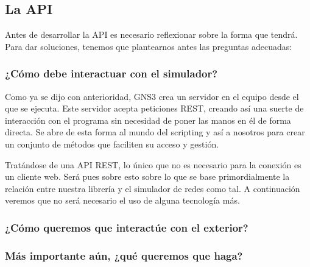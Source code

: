 \subsection{La API}
Antes de desarrollar la API es necesario reflexionar sobre la forma que tendrá. Para dar soluciones, tenemos que plantearnos antes las preguntas adecuadas:
\subsubsection[''Interacción con GNS3'']{¿Cómo debe interactuar con el simulador?}
Como ya se dijo con anterioridad, GNS3 crea un servidor en el equipo desde el que se ejecuta. Este servidor acepta peticiones REST, creando así una suerte de interacción con el programa sin necesidad de poner las manos en él de forma directa. Se abre de esta forma al mundo del scripting y así a nosotros para crear un conjunto de métodos que faciliten su acceso y gestión.

Tratándose de una API REST, lo único que no es necesario para la conexión es un cliente web. Será pues sobre esto sobre lo que se base primordialmente la relación entre nuestra librería y el simulador de redes como tal. A continuación veremos que no será necesario el uso de alguna tecnología más.


\subsubsection[''Acceso a la API'']{¿Cómo queremos que interactúe con el exterior?}


\subsubsection[''Utilidad'']{Más importante aún, ¿qué queremos que haga?}

